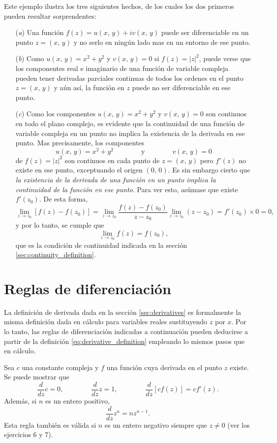 \documentclass[a4paper]{report}
\begin{document}
Este ejemplo ilustra los tres siguientes hechos, de los cuales los dos primeros pueden resultar sorprendentes:
\begin{enumerate}
 \item[(\textit{a})] Una función \(f(z)=u(x,\,y)+iv(x,\,y)\) puede ser diferenciable en un punto \(z=(x,\,y)\) y no serlo en ningún lado mas en un entorno de ese punto.
 \item[(\textit{b})] Como \(u(x,\,y)=x^2+y^2\) y \(v(x,\,y)=0\) si \(f(z)=|z|^2\), puede verse que los componentes real e imaginario de una función de variable compleja pueden tener derivadas parciales continuas de todos los ordenes en el punto \(z=(x,\,y)\) y aún así, la función en \(z\) puede no ser diferenciable en ese punto.
 \item[(\textit{c})] Como los componentes \(u(x,\,y)=x^2+y^2\) y \(v(x,\,y)=0\) son continuos en todo el plano complejo, es evidente que la continuidad de una función de variable compleja en un punto no implica la existencia de la derivada en ese punto. Mas precisamente, los componentes
 \[
  u(x,\,y)=x^2+y^2\qquad\qquad\textrm{y}\qquad\qquad v(x,\,y)=0
 \]
 de \(f(z)=|z|^2\) son continuos en cada punto de \(z=(x,\,y)\) pero \(f'(z)\) no existe en ese punto, exceptuando el origen \((0,\,0)\). Es sin embargo cierto que \emph{la existencia de la derivada de una función en un punto implica la continuidad de la función en ese punto}. Para ver esto, asúmase que existe \(f'(z_0)\). De esta forma,
 \[
  \lim_{z\to z_0}[f(z)-f(z_0)]=\lim_{z\to z_0}\frac{f(z)-f(z_0)}{z-z_0}\lim_{z\to z_0}(z-z_0)
  =f'(z_0)\times 0=0,
 \]
 y por lo tanto, se cumple que 
 \[
  \lim_{z\to z_0}f(z)=f(z_0),
 \]
 que es la condición de continuidad indicada en la sección \ref{sec:continuity_definition}.
\end{enumerate}

\section{Reglas de diferenciación}\label{sec:differentiation_rules}

La definición de derivada dada en la sección \ref{sec:derivatives} es formalmente la misma definición dada en cálculo para variables reales sustituyendo \(z\) por \(x\). Por lo tanto, las reglas de diferenciación indicadas a continuación pueden deducirse a partir de la definición \ref{eq:derivative_definition} empleando lo mismos pasos que en cálculo.

Sea \(c\) una constante compleja y \(f\) una función cuya derivada en el punto \(z\) existe. Se puede mostrar que 
\[
 \frac{d}{dz}c=0,\qquad\qquad
 \frac{d}{dz}z=1,\qquad\qquad
 \frac{d}{dz}[cf(z)]=cf'(z).
\]
Además, si \(n\) es un entero positivo,
\begin{equation}\label{eq:derivative_of_z_exp_n}
  \frac{d}{dz}z^n=nz^{n-1}.
\end{equation}
Esta regla también es válida si \(n\) es un entero negativo siempre que \(z\neq0\) (ver los ejercicios 6 y 7).
\end{document}
